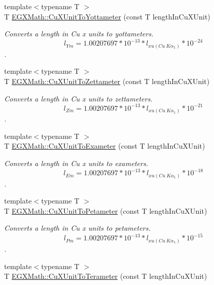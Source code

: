 \begin{DoxyCompactItemize}
{\footnotesize template$<$typename T $>$ }\\T \mbox{\hyperlink{group___e_g_x_math-_conversions-_length_conversions-_non-_s_i-_cu_x_unit-_s_i_ga0bd6ee075a560568ab46fd396a6e0b19}{E\+G\+X\+Math\+::\+Cu\+X\+Unit\+To\+Yottameter}} (const T length\+In\+Cu\+X\+Unit)
\begin{DoxyCompactList}\small\item\em Converts a length in Cu x units to yottameters. \[ l_{Ym}=1.00207697*10^{-13} * l_{xu(Cu\ K\alpha_1)} * 10^{-24} \]. \end{DoxyCompactList}\item 
{\footnotesize template$<$typename T $>$ }\\T \mbox{\hyperlink{group___e_g_x_math-_conversions-_length_conversions-_non-_s_i-_cu_x_unit-_s_i_ga1c95837914c023ff53343f87b76ac330}{E\+G\+X\+Math\+::\+Cu\+X\+Unit\+To\+Zettameter}} (const T length\+In\+Cu\+X\+Unit)
\begin{DoxyCompactList}\small\item\em Converts a length in Cu x units to zettameters. \[ l_{Zm}=1.00207697*10^{-13} * l_{xu(Cu\ K\alpha_1)} * 10^{-21} \]. \end{DoxyCompactList}\item 
{\footnotesize template$<$typename T $>$ }\\T \mbox{\hyperlink{group___e_g_x_math-_conversions-_length_conversions-_non-_s_i-_cu_x_unit-_s_i_ga316cae582cd83563ed7235488958606d}{E\+G\+X\+Math\+::\+Cu\+X\+Unit\+To\+Exameter}} (const T length\+In\+Cu\+X\+Unit)
\begin{DoxyCompactList}\small\item\em Converts a length in Cu x units to exameters. \[ l_{Em}=1.00207697*10^{-13} * l_{xu(Cu\ K\alpha_1)} * 10^{-18} \]. \end{DoxyCompactList}\item 
{\footnotesize template$<$typename T $>$ }\\T \mbox{\hyperlink{group___e_g_x_math-_conversions-_length_conversions-_non-_s_i-_cu_x_unit-_s_i_ga9e2e713fd8dc5117201b916333d61b76}{E\+G\+X\+Math\+::\+Cu\+X\+Unit\+To\+Petameter}} (const T length\+In\+Cu\+X\+Unit)
\begin{DoxyCompactList}\small\item\em Converts a length in Cu x units to petameters. \[ l_{Pm}=1.00207697*10^{-13} * l_{xu(Cu\ K\alpha_1)} * 10^{-15} \]. \end{DoxyCompactList}\item 
{\footnotesize template$<$typename T $>$ }\\T \mbox{\hyperlink{group___e_g_x_math-_conversions-_length_conversions-_non-_s_i-_cu_x_unit-_s_i_gae67d5afb9164df2584c669f90ee16f9a}{E\+G\+X\+Math\+::\+Cu\+X\+Unit\+To\+Terameter}} (const T length\+In\+Cu\+X\+Unit)

\end{DoxyCompactItemize}
